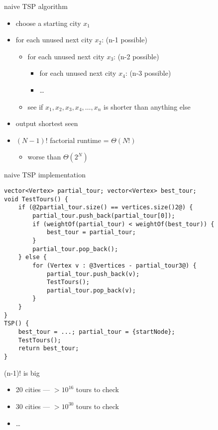 \begin{frame}{naive TSP algorithm}
\begin{itemize}
\item choose a starting city $x_1$
\item for each unused next city $x_2$: (n-1 possible)
    \begin{itemize}
    \item for each unused next city $x_3$: (n-2 possible)
    \begin{itemize}
    \item for each unused next city $x_4$: (n-3 possible)
    \item \ldots
    \end{itemize}
    \item see if $x_1,x_2,x_3,x_4,\ldots,x_n$ is shorter than anything else
    \end{itemize}
\item output shortest seen
\vspace{.5cm}
\item $(N-1)!$ factorial runtime = $\Theta(N!)$ 
    \begin{itemize}
    \item worse than $\Theta(2^N)$
    \end{itemize}
\end{itemize}
\end{frame}

\begin{frame}[fragile,label=implNaiveTSP]{naive TSP implementation}
\begin{lstlisting}
vector<Vertex> partial_tour; vector<Vertex> best_tour;
void TestTours() {
    if (@2partial_tour.size() == vertices.size()2@) {
        partial_tour.push_back(partial_tour[0]);
        if (weightOf(partial_tour) < weightOf(best_tour)) {
            best_tour = partial_tour;
        }
        partial_tour.pop_back();
    } else {
        for (Vertex v : @3vertices - partial_tour3@) {
            partial_tour.push_back(v);
            TestTours();
            partial_tour.pop_back(v);
        }
    }
}
TSP() {
    best_tour = ...; partial_tour = {startNode};
    TestTours();
    return best_tour;
}
\end{lstlisting}
\end{frame}

\begin{frame}{(n-1)! is big}
\begin{itemize}
\item 20 cities --- $>10^{16}$ tours to check
\item 30 cities --- $>10^{30}$ tours to check
\item \ldots
\end{itemize}
\end{frame}

